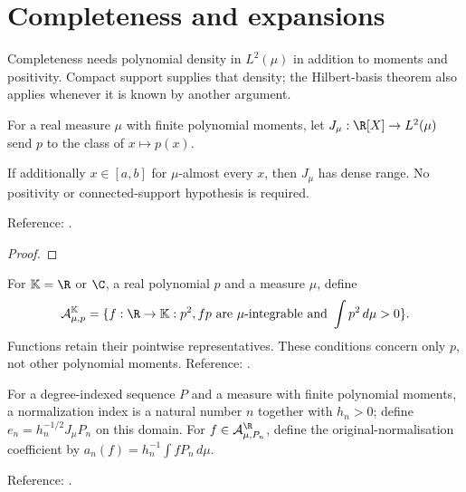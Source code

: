 \section{Completeness and expansions}\label{sec:textbook-general-completeness}

Completeness needs polynomial density in $L^2(\mu)$ in addition to moments and positivity. Compact support supplies that density; the Hilbert-basis theorem also applies whenever it is known by another argument.

\begin{definition}
\label{def:general-polynomial-L2}
\leanok
For a real measure $\mu$ with finite polynomial moments, let
$J_\mu:\R[X]\to L^2(\mu)$ send $p$ to the class of $x\mapsto p(x)$.
\end{definition}

\begin{theorem}
\label{thm:compact-polynomial-dense}
\leanok
If additionally $x\in[a,b]$ for $\mu$-almost every $x$, then $J_\mu$ has dense range. No positivity or connected-support hypothesis is required.

Reference: \cite[18.2(viii)]{dlmf}.
\end{theorem}
\begin{proof}
\leanok
\end{proof}

\begin{definition}
\label{def:integral-coefficient-input}
\leanok
For $\mathbb K=\R$ or $\C$, a real polynomial $p$ and a measure $\mu$, define
\[
\mathcal A_{\mu,p}^{\mathbb K}
 =\{f:\R\to\mathbb K: p^2,fp\text{ are }\mu\text{-integrable and }
                    \int p^2\,d\mu>0\}.
\]
Functions retain their pointwise representatives. These conditions concern
only $p$, not other polynomial moments.
Reference: \cite[18.2(viii)]{dlmf}.
\end{definition}

\begin{definition}
\label{def:general-normalised-L2}
\leanok
For a degree-indexed sequence $P$ and a measure with finite polynomial moments, a normalization index is a natural number $n$ together with $h_n>0$; define $e_n=h_n^{-1/2}J_\mu P_n$ on this domain. For $f\in\mathcal A_{\mu,P_n}^{\R}$, define the original-normalisation coefficient by $a_n(f)=h_n^{-1}\int fP_n\,d\mu$.

Reference: \cite[18.2(viii)]{dlmf}.
\end{definition}


